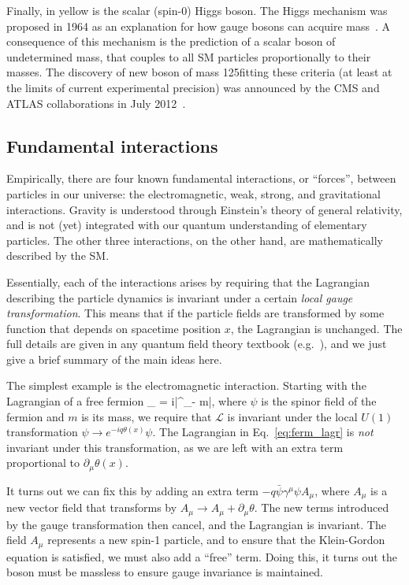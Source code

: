Finally, in yellow is the scalar (spin-0) Higgs boson. The Higgs mechanism was proposed in 1964 as an explanation
for how gauge bosons can acquire mass~\cite{Englert,Higgs,Guralnik}. A consequence of this mechanism is the prediction of a
scalar boson of undetermined mass, that couples to all SM particles proportionally to their masses.
The discovery of new boson of mass 125\GeV fitting these criteria (at least at the limits of current experimental precision) 
was announced by the CMS and ATLAS collaborations in July 2012~\cite{ATLAS:higgs,CMS:higgs}.

\subsection{Fundamental interactions}
\label{sec:fund_int}

Empirically, there are four known fundamental interactions, or ``forces'', between particles in our universe: 
the electromagnetic, weak, strong, and gravitational interactions. Gravity is understood
through Einstein's theory of general relativity, and is not (yet) integrated with our quantum understanding
of elementary particles. The other three interactions, on the other hand, are mathematically described by the
SM.

Essentially, each of the interactions arises by requiring that the Lagrangian describing the particle dynamics is
invariant under a certain \textit{local gauge transformation}. This means that if the particle fields are transformed
by some function that depends on spacetime position $x$, the Lagrangian is unchanged.
The full details are given in any quantum field theory textbook (e.g.~\cite{Peskin}), and we just give a brief
summary of the main ideas here.

The simplest example is the electromagnetic interaction. Starting with the Lagrangian of a free fermion
\vspace{-5mm}
\be\label{eq:ferm_lagr}
_ = i\bar{\psi}\gamma^\mu\partial_\mu\psi - m\bar{\psi}\psi,
\ee
where $\psi$ is the spinor field of the fermion and $m$ is its mass,
we require that $\mathcal{L}$ is invariant under the local $U(1)$ transformation $\psi\to e^{-iq\theta(x)}\psi$.
The Lagrangian in Eq.~\ref{eq:ferm_lagr} is \textit{not} invariant under this transformation,
as we are left with an extra term proportional to $\partial_\mu\theta(x)$.

It turns out we can fix this by adding an extra term $-q\bar{\psi}\gamma^\mu\psi A_\mu$, where
$A_\mu$ is a new vector field that transforms by $A_\mu\to A_\mu+\partial_\mu\theta$. The new terms
introduced by the gauge transformation then cancel, and the Lagrangian is invariant.  The field
$A_\mu$ represents a new spin-1 particle, and to ensure that the Klein-Gordon equation is satisfied,
we must also add a ``free'' term. Doing this, it turns out the boson must be massless to ensure gauge invariance is
maintained.

